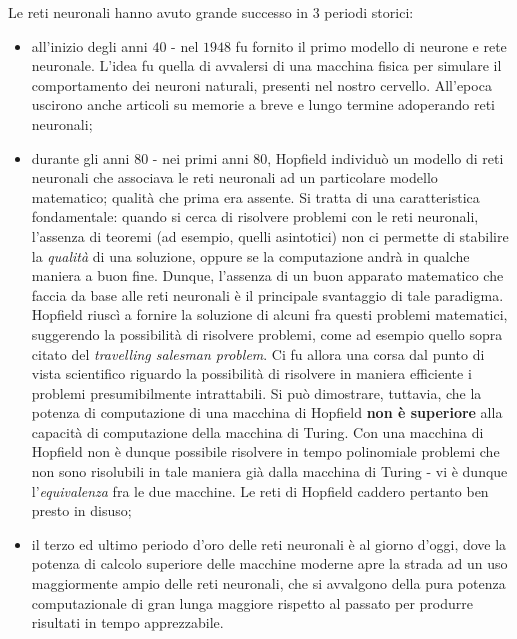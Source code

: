 \documentclass[10pt]{book}
\begin{document}
Le reti neuronali hanno avuto grande successo in $3$ periodi storici:
\begin{itemize}
    \item all'inizio degli anni $40$ \-- nel $1948$ fu fornito il primo modello
        di neurone e rete neuronale. L'idea fu quella di avvalersi di una
        macchina fisica per simulare il comportamento dei neuroni naturali,
        presenti nel nostro cervello. All'epoca uscirono anche articoli su
        memorie a breve e lungo termine adoperando reti neuronali;
    \item durante gli anni $80$ \-- nei primi anni $80$, Hopfield individuò un
        modello di reti neuronali che associava le reti neuronali ad un
        particolare modello matematico; qualità che prima era assente. Si
        tratta di una caratteristica fondamentale: quando si cerca di risolvere
        problemi con le reti neuronali, l'assenza di teoremi (ad esempio,
        quelli asintotici) non ci permette di stabilire la \emph{qualità} di
        una soluzione, oppure se la computazione andrà in qualche maniera a
        buon fine. Dunque, l'assenza di un buon apparato matematico che faccia
        da base alle reti neuronali è il principale svantaggio di tale
        paradigma. Hopfield riuscì a fornire la soluzione di alcuni fra questi
        problemi matematici, suggerendo la possibilità di risolvere problemi,
        come ad esempio quello sopra citato del \emph{travelling salesman
        problem}. Ci fu allora una corsa dal punto di vista scientifico
        riguardo la possibilità di risolvere in maniera efficiente i problemi
        presumibilmente intrattabili. Si può dimostrare, tuttavia, che la
        potenza di computazione di una macchina di Hopfield \textbf{non è
        superiore} alla capacità di computazione della macchina di Turing. Con
        una macchina di Hopfield non è dunque possibile risolvere in tempo
        polinomiale problemi che non sono risolubili in tale maniera già dalla
        macchina di Turing \-- vi è dunque l'\emph{equivalenza} fra le due
        macchine. Le reti di Hopfield caddero pertanto ben presto in disuso;
    \item il terzo ed ultimo periodo d'oro delle reti neuronali è al giorno
        d'oggi, dove la potenza di calcolo superiore delle macchine moderne
        apre la strada ad un uso maggiormente ampio delle reti neuronali, che
        si avvalgono della pura potenza computazionale di gran lunga maggiore
        rispetto al passato per produrre risultati in tempo apprezzabile.
\end{itemize}
\end{document}
